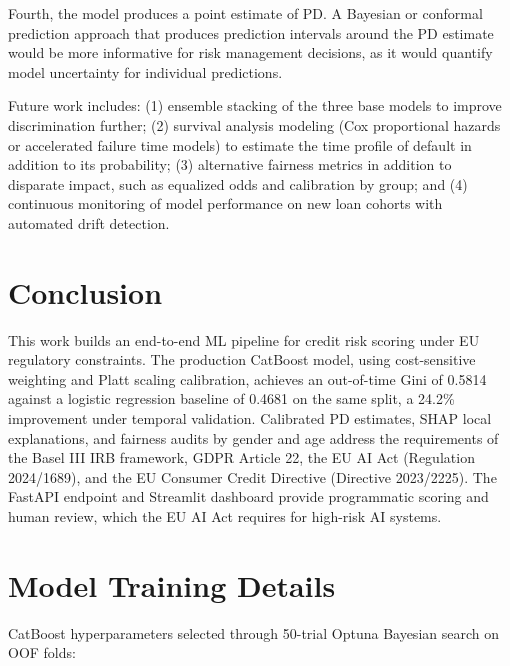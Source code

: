 \documentclass[11pt, a4paper]{article}
\begin{document}
Fourth, the model produces a point estimate of PD. A Bayesian or conformal prediction approach that produces prediction intervals around the PD estimate would be more informative for risk management decisions, as it would quantify model uncertainty for individual predictions.

Future work includes: (1) ensemble stacking of the three base models to improve discrimination further; (2) survival analysis modeling (Cox proportional hazards or accelerated failure time models) to estimate the time profile of default in addition to its probability; (3) alternative fairness metrics in addition to disparate impact, such as equalized odds and calibration by group; and (4) continuous monitoring of model performance on new loan cohorts with automated drift detection.

\section{Conclusion}
\label{sec:conclusion}

This work builds an end-to-end ML pipeline for credit risk scoring under EU regulatory constraints. The production CatBoost model, using cost-sensitive weighting and Platt scaling calibration, achieves an out-of-time Gini of 0.5814 against a logistic regression baseline of 0.4681 on the same split, a 24.2\% improvement under temporal validation. Calibrated PD estimates, SHAP local explanations, and fairness audits by gender and age address the requirements of the Basel III IRB framework, GDPR Article 22, the EU AI Act (Regulation 2024/1689), and the EU Consumer Credit Directive (Directive 2023/2225). The FastAPI endpoint and Streamlit dashboard provide programmatic scoring and human review, which the EU AI Act requires for high-risk AI systems.

\appendix

\section{Model Training Details}
\label{app:training}

CatBoost hyperparameters selected through 50-trial Optuna Bayesian search on OOF folds:
\end{document}
